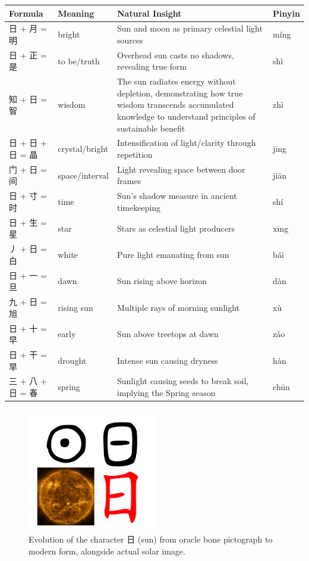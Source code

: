 \documentclass[11pt,letterpaper]{article}
\begin{document}
\begin{longtable}{|p{3cm}|p{3cm}|p{6cm}|p{2cm}|}
\hline
\textbf{Formula} & \textbf{Meaning} & \textbf{Natural Insight} & \textbf{Pinyin} \\
\hline
日 + 月 = 明 & bright & Sun and moon as primary celestial light sources & míng \\
\hline
日 + 正 = 是 & to be/truth & Overhead sun casts no shadows, revealing true form & shì \\
\hline
知 + 日 = 智 & wisdom & The sun radiates energy without depletion,
demonstrating how true wisdom transcends accumulated knowledge to
understand principles of sustainable benefit & zhì \\
\hline
日 + 日 + 日 = 晶 & crystal/bright & Intensification of light/clarity through repetition & jīng \\
\hline
门 + 日 = 间 & space/interval & Light revealing space between door frames & jiān \\
\hline
日 + 寸 = 时 & time & Sun's shadow measure in ancient timekeeping & shí \\
\hline
日 + 生 = 星 & star & Stars as celestial light producers & xīng \\
\hline
丿 + 日 = 白 & white & Pure light emanating from sun & bái \\
\hline
日 + 一 = 旦 & dawn & Sun rising above horizon & dàn \\
\hline
九 + 日 = 旭 & rising sun & Multiple rays of morning sunlight & xù \\
\hline
日 + 十 = 早 & early & Sun above treetops at dawn & zǎo \\
\hline
日 + 干 = 旱 & drought & Intense sun causing dryness & hàn \\
\hline
三 + 八 + 日 = 春 & spring & Sunlight causing seeds to break soil, implying the Spring season &
chūn \\
\hline
\end{longtable}

\begin{figure}
\centering
\includegraphics[width=0.5\textwidth]{./images/zi_sun.png}
\caption{Evolution of the character 日 (sun) from oracle bone pictograph
to modern form, alongside actual solar image.}
\end{figure}
\end{document}
